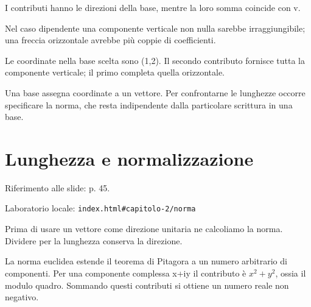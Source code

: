 I contributi hanno le direzioni della base, mentre la loro somma coincide con v.\par


\label{c2-basi-example-2-step-4}


Nel caso dipendente una componente verticale non nulla sarebbe irraggiungibile; una freccia orizzontale avrebbe più coppie di coefficienti.\par



Le coordinate nella base scelta sono (1,2). Il secondo contributo fornisce tutta la componente verticale; il primo completa quella orizzontale.\par


Una base assegna coordinate a un vettore. Per confrontarne le lunghezze occorre specificare la norma, che resta indipendente dalla particolare scrittura in una base.\par


\Needspace{.43\textheight}
\section{Lunghezza e normalizzazione}
\label{c2-norma}

{\sffamily\small\color{Ink!70} Riferimento alle slide: p. 45.\par}

{\sffamily\small\color{Ink!70} Laboratorio locale: \nolinkurl{index.html#capitolo-2/norma}\par}

Prima di usare un vettore come direzione unitaria ne calcoliamo la norma. Dividere per la lunghezza conserva la direzione.\par

La norma euclidea estende il teorema di Pitagora a un numero arbitrario di componenti. Per una componente complessa x+iy il contributo è \(x^{2}+y^{2}\), ossia il modulo quadro. Sommando questi contributi si ottiene un numero reale non negativo.\par

